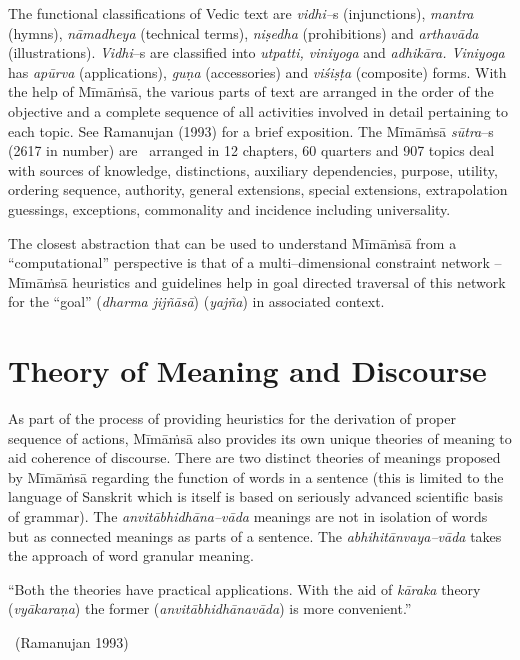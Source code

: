 The functional classifications of Vedic text are \textit{vidhi–}s (injunctions),\textit{ mantra} (hymns), \textit{nāmadheya} (technical terms), \textit{niṣedha} (prohibitions) and \textit{arthavāda} (illustrations). \textit{Vidhi}–s are classified into \textit{utpatti, viniyoga} and \textit{adhikāra. Viniyoga} has \textit{apūrva} (applications), \textit{guṇa} (accessories) and \textit{viśiṣṭa} (composite) forms. With the help of Mīmāṁsā, the various parts of text are arranged in the order of the objective and a complete sequence of all activities involved in detail pertaining to each topic. See Ramanujan (1993) for a brief exposition. The Mīmāṁsā \textit{sūtra}–s (2617 in number) are  arranged in 12 chapters, 60 quarters and 907 topics deal with sources of knowledge, distinctions, auxiliary dependencies, purpose, utility, ordering sequence, authority, general extensions, special extensions, extrapolation guessings, exceptions, commonality and incidence including universality.

The closest abstraction that can be used to understand Mīmāṁsā from a “computational” perspective is that of a multi–dimensional constraint network – Mīmāṁsā heuristics and guidelines help in goal directed traversal of this network for the “goal” (\textit{dharma jijñāsā}) (\textit{yajña}) in associated context.


\section*{Theory of Meaning and Discourse}

As part of the process of providing heuristics for the derivation of proper sequence of actions, Mīmāṁsā also provides its own unique theories of meaning to aid coherence of discourse. There are two distinct theories of meanings proposed by Mīmāṁsā regarding the function of words in a sentence (this is limited to the language of Sanskrit which is itself is based on seriously advanced scientific basis of grammar). The \textit{anvitābhidhāna–vāda} meanings are not in isolation of words but as connected meanings as parts of a sentence. The \textit{abhihitānvaya–vāda} takes the approach of word granular meaning.

\begin{myquote}
“Both the theories have practical applications. With the aid of \textit{kāraka} theory (\textit{vyākaraṇa}) the former (\textit{anvitābhidhānavāda}) is more convenient.”

~\hfill (Ramanujan 1993)
\end{myquote}

